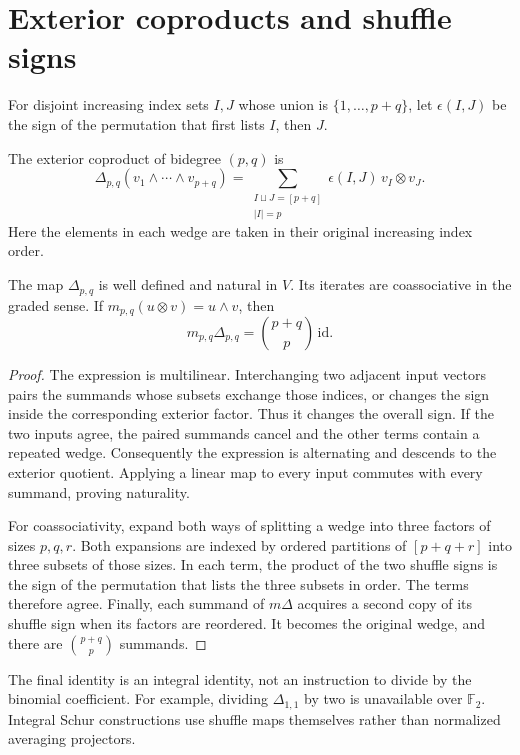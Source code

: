 \section{Exterior coproducts and shuffle signs}

For disjoint increasing index sets \(I,J\) whose union is
\(\{1,\ldots,p+q\}\), let \(\epsilon(I,J)\) be the sign of the
permutation that first lists \(I\), then \(J\).

\begin{definition}
The exterior coproduct of bidegree \((p,q)\) is
\[
 \Delta_{p,q}(v_1\wedge\cdots\wedge v_{p+q})
  =\sum_{\substack{I\sqcup J=[p+q]\\ |I|=p}}
    \epsilon(I,J)\,v_I\otimes v_J.
\]
Here the elements in each wedge are taken in their original increasing
index order.
\end{definition}

\begin{proposition}
The map \(\Delta_{p,q}\) is well defined and natural in \(V\).
Its iterates are coassociative in the graded sense.  If
\(m_{p,q}(u\otimes v)=u\wedge v\), then
\[
 m_{p,q}\Delta_{p,q}=\binom{p+q}{p}\,\mathrm{id}.
\]
\end{proposition}
\begin{proof}
The expression is multilinear.  Interchanging two adjacent input
vectors pairs the summands whose subsets exchange those indices, or
changes the sign inside the corresponding exterior factor.  Thus it
changes the overall sign.  If the two inputs agree, the paired
summands cancel and the other terms contain a repeated wedge.
Consequently the expression is alternating and descends to the
exterior quotient.  Applying a linear map to every input commutes
with every summand, proving naturality.

For coassociativity, expand both ways of splitting a wedge into
three factors of sizes \(p,q,r\).  Both expansions are indexed by
ordered partitions of \([p+q+r]\) into three subsets of those sizes.
In each term, the product of the two shuffle signs is the sign of
the permutation that lists the three subsets in order.  The terms
therefore agree.  Finally, each summand of \(m\Delta\) acquires a
second copy of its shuffle sign when its factors are reordered.
It becomes the original wedge, and there are \(\binom{p+q}{p}\)
summands.
\end{proof}

The final identity is an integral identity, not an instruction to
divide by the binomial coefficient.  For example, dividing
\(\Delta_{1,1}\) by two is unavailable over \(\mathbb F_2\).
Integral Schur constructions use shuffle maps themselves rather than
normalized averaging projectors.


